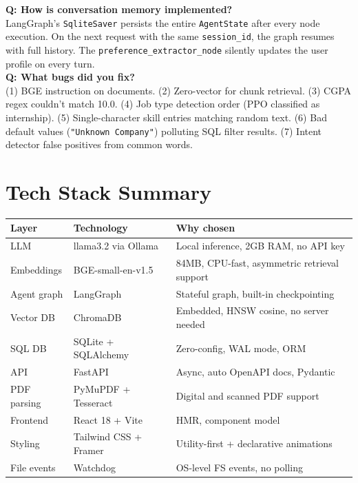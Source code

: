 \documentclass[12pt, a4paper]{article}
\begin{document}
\begin{interviewbox}
\textbf{Q: How is conversation memory implemented?}\\
LangGraph's \texttt{SqliteSaver} persists the entire \texttt{AgentState} after every node execution. On the next request with the same \texttt{session\_id}, the graph resumes with full history. The \texttt{preference\_extractor\_node} silently updates the user profile on every turn.\\[6pt]

\textbf{Q: What bugs did you fix?}\\
(1) BGE instruction on documents. (2) Zero-vector for chunk retrieval. (3) CGPA regex couldn't match 10.0. (4) Job type detection order (PPO classified as internship). (5) Single-character skill entries matching random text. (6) Bad default values (\texttt{"Unknown Company"}) polluting SQL filter results. (7) Intent detector false positives from common words.

\end{interviewbox}

\section{Tech Stack Summary}

\begin{tabularx}{\textwidth}{llX}
\toprule
\textbf{Layer} & \textbf{Technology} & \textbf{Why chosen} \\
\midrule
LLM         & llama3.2 via Ollama      & Local inference, 2GB RAM, no API key \\
Embeddings  & BGE-small-en-v1.5        & 84MB, CPU-fast, asymmetric retrieval support \\
Agent graph & LangGraph                & Stateful graph, built-in checkpointing \\
Vector DB   & ChromaDB                 & Embedded, HNSW cosine, no server needed \\
SQL DB      & SQLite + SQLAlchemy      & Zero-config, WAL mode, ORM \\
API         & FastAPI                  & Async, auto OpenAPI docs, Pydantic \\
PDF parsing & PyMuPDF + Tesseract      & Digital and scanned PDF support \\
Frontend    & React 18 + Vite          & HMR, component model \\
Styling     & Tailwind CSS + Framer    & Utility-first + declarative animations \\
File events & Watchdog                 & OS-level FS events, no polling \\
\bottomrule
\end{tabularx}

\end{document}
